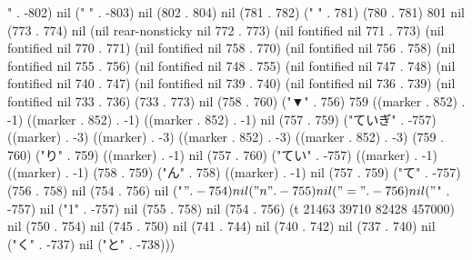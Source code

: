 " . -802) nil (" " . -803) nil (802 . 804) nil (781 . 782) (" " . 781) (780 . 781) 801 nil (773 . 774) nil (nil rear-nonsticky nil 772 . 773) (nil fontified nil 771 . 773) (nil fontified nil 770 . 771) (nil fontified nil 758 . 770) (nil fontified nil 756 . 758) (nil fontified nil 755 . 756) (nil fontified nil 748 . 755) (nil fontified nil 747 . 748) (nil fontified nil 740 . 747) (nil fontified nil 739 . 740) (nil fontified nil 736 . 739) (nil fontified nil 733 . 736) (733 . 773) nil (758 . 760) ("▼" . 756) 759 ((marker . 852) . -1) ((marker . 852) . -1) ((marker . 852) . -1) nil (757 . 759) ("ていぎ" . -757) ((marker) . -3) ((marker) . -3) ((marker . 852) . -3) ((marker . 852) . -3) (759 . 760) ("り" . 759) ((marker) . -1) nil (757 . 760) ("てい" . -757) ((marker) . -1) ((marker) . -1) (758 . 759) ("ん" . 758) ((marker) . -1) nil (757 . 759) ("て" . -757) (756 . 758) nil (754 . 756) nil ("$" . -754) nil ("n" . -755) nil ("=" . -756) nil ("$" . -757) nil ("1" . -757) nil (755 . 758) nil (754 . 756) (t 21463 39710 82428 457000) nil (750 . 754) nil (745 . 750) nil (741 . 744) nil (740 . 742) nil (737 . 740) nil ("く" . -737) nil ("と" . -738)))
